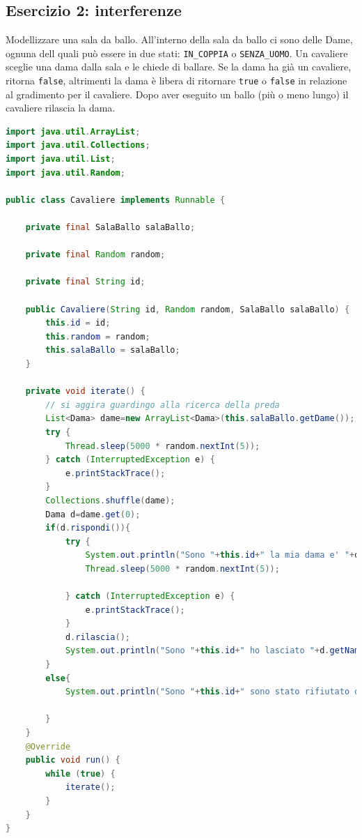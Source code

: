\documentclass{article}
\begin{document}
\subsection{Esercizio 2: interferenze}
\begin{framed}
Modellizzare una sala da ballo. All'interno della sala da ballo ci sono delle Dame, ognuna dell quali pu\`o essere in due stati: \texttt{IN\_COPPIA} o \texttt{SENZA\_UOMO}. Un cavaliere sceglie una dama dalla sala e le chiede di ballare. Se la dama ha gi\`a un cavaliere, ritorna \texttt{false}, altrimenti la dama \`e libera di ritornare \texttt{true} o \texttt{false} in relazione al gradimento per il cavaliere. Dopo aver eseguito un ballo (pi\`u o meno lungo) il cavaliere rilascia la dama.
\end{framed}
\begin{lstlisting}[language=Java]
import java.util.ArrayList;
import java.util.Collections;
import java.util.List;
import java.util.Random;

public class Cavaliere implements Runnable {

	private final SalaBallo salaBallo;

	private final Random random;

	private final String id;

	public Cavaliere(String id, Random random, SalaBallo salaBallo) {
		this.id = id;
		this.random = random;
		this.salaBallo = salaBallo;
	}

	private void iterate() {
		// si aggira guardingo alla ricerca della preda
		List<Dama> dame=new ArrayList<Dama>(this.salaBallo.getDame());
		try {
			Thread.sleep(5000 * random.nextInt(5));
		} catch (InterruptedException e) {
			e.printStackTrace();
		}
		Collections.shuffle(dame);
		Dama d=dame.get(0);
		if(d.rispondi()){
			try {
				System.out.println("Sono "+this.id+" la mia dama e' "+d.getName());
				Thread.sleep(5000 * random.nextInt(5));
				
			} catch (InterruptedException e) {
				e.printStackTrace();
			}
			d.rilascia();
			System.out.println("Sono "+this.id+" ho lasciato "+d.getName());
		}
		else{
			System.out.println("Sono "+this.id+" sono stato rifiutato da "+d.getName());
			
		}
	}
	@Override
	public void run() {
		while (true) {
			iterate();
		}
	}
}
\end{lstlisting}
\end{document}

